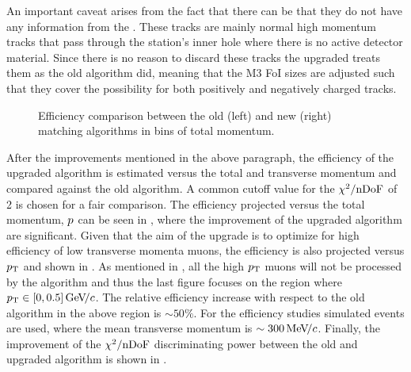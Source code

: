 An important caveat arises from the fact that there can be \veloTTracks that they do not have any information from
the \ttracker. These tracks are mainly normal high momentum tracks that pass through the \ttracker station's inner hole
where there is no active detector material. Since there is no reason to discard these tracks the upgraded \mvTTm treats
them as the old \mvm algorithm did, meaning that the M3 FoI sizes are adjusted such that they cover
the possibility for both positively and negatively charged tracks.

\begin{figure}[t]
  \centering
  \begin{subfigure}{0.5\textwidth}
    \scalebox{.6}{}
    \caption{}
    \label{mvTTm_eff_p}
  \end{subfigure}%
  \hfill%
  \begin{subfigure}{0.5\textwidth}
    \scalebox{.6}{}
    \caption{}
    \label{mvm_eff_p}
  \end{subfigure}
  \caption{Efficiency comparison between the old (left) and new (right) matching algorithms in bins of total momentum.}
 \label{mvm_eff_p_comp}
\end{figure}

After the improvements mentioned in the above paragraph, the efficiency of the upgraded \mvTTm algorithm
is estimated versus the total and transverse momentum and compared against the old algorithm. A common cutoff value for
the $\chi^2/{\rm nDoF}$ of 2 is chosen for a fair comparison. The efficiency projected versus the total momentum, $\mbox{$p$}$
can be seen in , where the improvement of the upgraded \mvTTm algorithm are significant.
Given that the aim of the \mvTTm upgrade is to optimize for high efficiency of low transverse momenta muons,
the efficiency is also projected versus $\mbox{$p_{\rm T}$}$ and shown in . As mentioned
in , all the high $\mbox{$p_{\rm T}$}$ muons will not be processed by the \mvTTm algorithm and thus
the last figure focuses on the region where $\mbox{$p_{\rm T}$}\in[0,0.5]{\mathrm{\,Ge\kern -0.1em V\!/}c}$. The relative efficiency increase with
respect to the old \mvm algorithm in the above region is $\sim 50\%$. For the efficiency studies \Sigmapmumu
simulated events are used, where the mean transverse momentum is $\sim 300{\mathrm{\,Me\kern -0.1em V\!/}c}$. Finally, the improvement
of the $\chi^2/{\rm nDoF}$ discriminating power between the old and upgraded algorithm is shown in .

